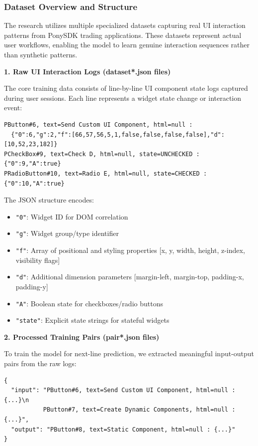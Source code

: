 \documentclass[12pt,a4paper]{article}
\begin{document}
\subsubsection{Dataset Overview and Structure}

The research utilizes multiple specialized datasets capturing real UI interaction patterns from PonySDK trading applications. These datasets represent actual user workflows, enabling the model to learn genuine interaction sequences rather than synthetic patterns.

\textbf{1. Raw UI Interaction Logs (dataset*.json files)}

The core training data consists of line-by-line UI component state logs captured during user sessions. Each line represents a widget state change or interaction event:

\begin{lstlisting}[caption=Example UI Interaction Log Entry]
PButton#6, text=Send Custom UI Component, html=null : 
  {"0":6,"g":2,"f":[66,57,56,5,1,false,false,false,false],"d":[10,52,23,182]}
PCheckBox#9, text=Check D, html=null, state=UNCHECKED : {"0":9,"A":true}
PRadioButton#10, text=Radio E, html=null, state=CHECKED : {"0":10,"A":true}
\end{lstlisting}

The JSON structure encodes:
\begin{itemize}
\item \texttt{"0"}: Widget ID for DOM correlation
\item \texttt{"g"}: Widget group/type identifier
\item \texttt{"f"}: Array of positional and styling properties [x, y, width, height, z-index, visibility flags]
\item \texttt{"d"}: Additional dimension parameters [margin-left, margin-top, padding-x, padding-y]
\item \texttt{"A"}: Boolean state for checkboxes/radio buttons
\item \texttt{"state"}: Explicit state strings for stateful widgets
\end{itemize}

\textbf{2. Processed Training Pairs (pair*.json files)}

To train the model for next-line prediction, we extracted meaningful input-output pairs from the raw logs:

\begin{lstlisting}[caption=Training Pair Structure]
{
  "input": "PButton#6, text=Send Custom UI Component, html=null : {...}\n
           PButton#7, text=Create Dynamic Components, html=null : {...}",
  "output": "PButton#8, text=Static Component, html=null : {...}"
}
\end{lstlisting}
\end{document}
